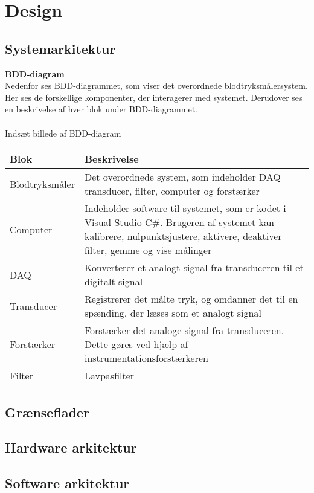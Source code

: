 \chapter{Design}

\section{Systemarkitektur} 


\textbf{BDD-diagram}\\
Nedenfor ses BDD-diagrammet, som viser det overordnede blodtryksmålersystem. Her ses de forskellige komponenter, der interagerer med systemet. Derudover ses en beskrivelse af hver blok under BDD-diagrammet.\\
\\
Indsæt billede af BDD-diagram

\begin{longtabu} to 
	Blok &	Beskrivelse \\[-1ex]
	\midrule
	Blodtryksmåler & Det overordnede system, som indeholder DAQ transducer, filter, computer og forstærker\\[-1ex]
	Computer & Indeholder software til systemet, som er kodet i Visual Studio C\#. Brugeren af systemet kan kalibrere, nulpunktsjustere, aktivere, deaktiver filter, gemme og vise målinger\\[-1ex]
	DAQ & Konverterer et analogt signal fra transduceren til et digitalt signal\\[-1ex]
	Transducer & Registrerer det målte tryk, og omdanner det til en spænding, der læses som et analogt signal\\[-1ex]
	Forstærker & Forstærker det analoge signal fra transduceren. Dette gøres ved hjælp af instrumentationsforstærkeren\\[-1ex]
	Filter & Lavpasfilter\\[-1ex]
\end{longtabu}


\section{Grænseflader}


\section{Hardware arkitektur}


\section{Software arkitektur}

